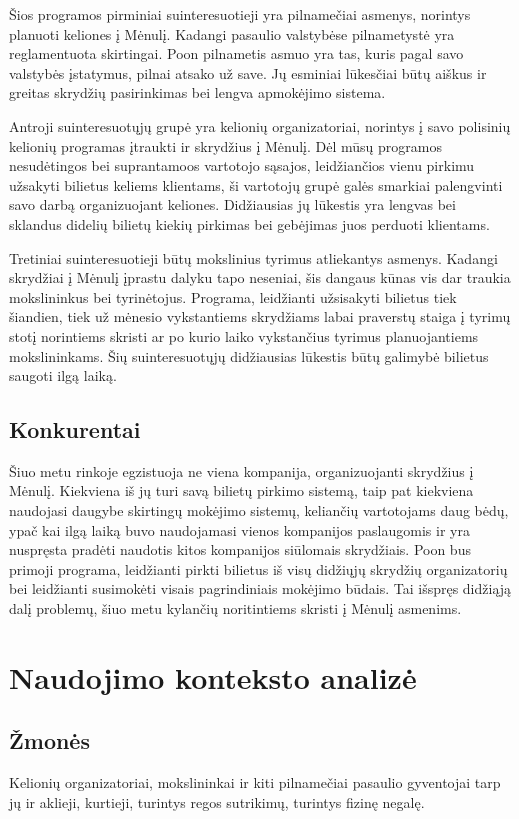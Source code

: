\documentclass{VUMIFPSkursinis}
\begin{document}
Šios programos pirminiai suinteresuotieji yra pilnamečiai asmenys, norintys planuoti keliones į Mėnulį. Kadangi pasaulio valstybėse pilnametystė yra reglamentuota skirtingai. Poon pilnametis asmuo yra tas, kuris pagal savo valstybės įstatymus, pilnai atsako už save. Jų esminiai lūkesčiai būtų aiškus ir greitas skrydžių pasirinkimas bei lengva apmokėjimo sistema.

Antroji suinteresuotųjų grupė yra kelionių organizatoriai, norintys į savo polisinių kelionių programas įtraukti ir skrydžius į Mėnulį. Dėl mūsų programos nesudėtingos bei suprantamoos vartotojo sąsajos, leidžiančios vienu pirkimu užsakyti bilietus keliems klientams, ši vartotojų grupė galės smarkiai palengvinti savo darbą organizuojant keliones. Didžiausias jų lūkestis yra lengvas bei sklandus didelių bilietų kiekių pirkimas bei gebėjimas juos perduoti klientams.

Tretiniai suinteresuotieji būtų mokslinius tyrimus atliekantys asmenys. Kadangi skrydžiai į Mėnulį įprastu dalyku tapo neseniai, šis dangaus kūnas vis dar traukia mokslininkus bei tyrinėtojus. Programa, leidžianti užsisakyti bilietus tiek šiandien, tiek už mėnesio vykstantiems skrydžiams labai praverstų staiga į tyrimų stotį norintiems skristi ar po kurio laiko vykstančius tyrimus planuojantiems mokslininkams. Šių suinteresuotųjų didžiausias lūkestis būtų galimybė bilietus saugoti ilgą laiką.

\subsection{Konkurentai}
Šiuo metu rinkoje egzistuoja ne viena kompanija, organizuojanti skrydžius į Mėnulį. Kiekviena iš jų turi savą bilietų pirkimo sistemą, taip pat kiekviena naudojasi daugybe skirtingų mokėjimo sistemų, keliančių vartotojams daug bėdų, ypač kai ilgą laiką buvo naudojamasi vienos kompanijos paslaugomis ir yra nuspręsta pradėti naudotis kitos kompanijos siūlomais skrydžiais. Poon bus primoji programa, leidžianti pirkti bilietus iš visų didžiųjų skrydžių organizatorių bei leidžianti susimokėti visais pagrindiniais mokėjimo būdais. Tai išspręs didžiąją dalį problemų, šiuo metu kylančių noritintiems skristi į Mėnulį asmenims.

\section{Naudojimo konteksto analizė}

\subsection{Žmonės}
Kelionių organizatoriai, mokslininkai ir kiti pilnamečiai pasaulio gyventojai tarp jų ir aklieji, kurtieji, turintys regos sutrikimų, turintys fizinę negalę.
\end{document}
